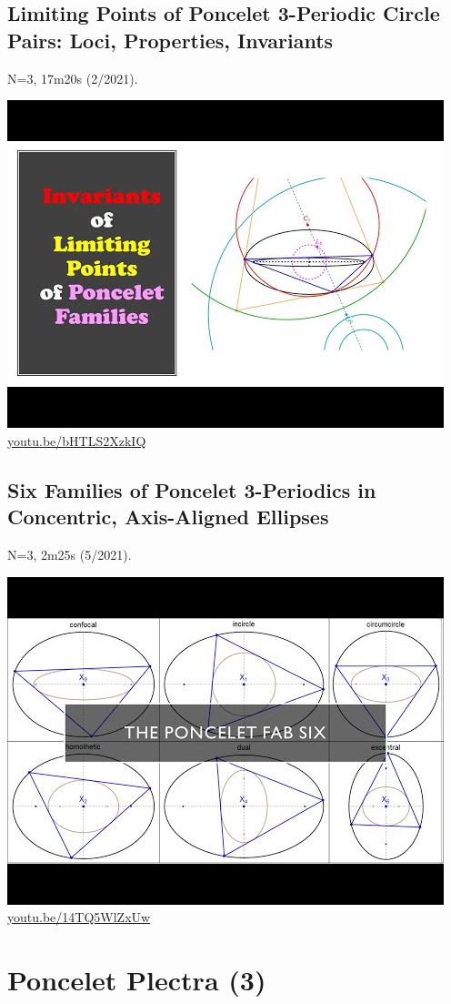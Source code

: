 \documentclass[12pt]{amsart}
\begin{document}
\subsection{Limiting Points of Poncelet 3-Periodic Circle Pairs: Loci, Properties, Invariants}
\label{vid:bHTLS2XzkIQ}
\noindent N=3, 17m20s (2/2021). 
\begin{center}\includegraphics[width=.5\textwidth]{pics/bHTLS2XzkIQ.jpg} \\ 
\href{https://youtu.be/bHTLS2XzkIQ}{\url{youtu.be/bHTLS2XzkIQ}}\end{center}
% 

\subsection{Six Families of Poncelet 3-Periodics in Concentric, Axis-Aligned Ellipses}
\label{vid:14TQ5WlZxUw}
\noindent N=3, 2m25s (5/2021). 
\begin{center}\includegraphics[width=.5\textwidth]{pics/14TQ5WlZxUw.jpg} \\ 
\href{https://youtu.be/14TQ5WlZxUw}{\url{youtu.be/14TQ5WlZxUw}}\end{center}
% 


\section{Poncelet Plectra (3)}
\end{document}
